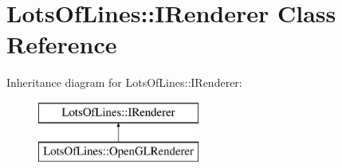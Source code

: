 \hypertarget{class_lots_of_lines_1_1_i_renderer}{}\section{Lots\+Of\+Lines\+:\+:I\+Renderer Class Reference}
\label{class_lots_of_lines_1_1_i_renderer}
Inheritance diagram for Lots\+Of\+Lines\+:\+:I\+Renderer\+:\begin{figure}[H]
\begin{center}
\leavevmode
\includegraphics[height=2.000000cm]{class_lots_of_lines_1_1_i_renderer}
\end{center}
\end{figure}
